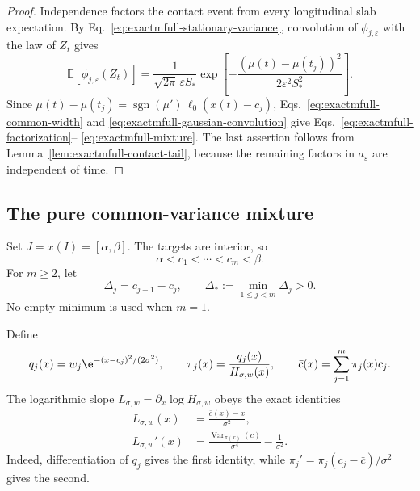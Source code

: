 \begin{proof}
Independence factors the contact event from every longitudinal slab
expectation.  By Eq.~\eqref{eq:exactmfull-stationary-variance}, convolution
of \(\phi_{j,\varepsilon}\) with the law of \(Z_t\) gives
\begin{equation}
 \mathbb E[\phi_{j,\varepsilon}(Z_t)]
 =\frac{1}{\sqrt{2\pi}\,\varepsilon S_*}
 \exp\!\left[-\frac{(\mu(t)-\mu(t_j))^2}
 {2\varepsilon^2S_*^2}\right].
 \label{eq:exactmfull-gaussian-convolution}
\end{equation}
Since
\(\mu(t)-\mu(t_j)=\operatorname{sgn}(\mu')\,\ell_0(x(t)-c_j)\),
Eqs.~\eqref{eq:exactmfull-common-width} and
\eqref{eq:exactmfull-gaussian-convolution} give
Eqs.~\eqref{eq:exactmfull-factorization}--%
\eqref{eq:exactmfull-mixture}.  The last assertion follows from
Lemma~\ref{lem:exactmfull-contact-tail}, because the remaining factors in
\(a_\varepsilon\) are independent of time.
\end{proof}

\subsection{The pure common-variance mixture}
\label{subsec:exactmfull-pure-mixture}

Set \(J=x(I)=[\alpha,\beta]\).  The targets are interior, so
\begin{equation}
 \alpha<c_1<\cdots<c_m<\beta.
 \label{eq:exactmfull-centre-order}
\end{equation}
For \(m\ge2\), let
\begin{equation}
 \Delta_j=c_{j+1}-c_j,
 \qquad \Delta_*:=\min_{1\le j<m}\Delta_j>0.
 \label{eq:exactmfull-gaps}
\end{equation}
No empty minimum is used when \(m=1\).

Define
\begin{equation}
 q_j(x)=w_j\e^{-(x-c_j)^2/(2\sigma^2)},
 \qquad
 \pi_j(x)=\frac{q_j(x)}{H_{\sigma,w}(x)},
 \qquad
 \bar c(x)=\sum_{j=1}^m\pi_j(x)c_j.
 \label{eq:exactmfull-posterior}
\end{equation}
The logarithmic slope \(L_{\sigma,w}=\partial_x\log H_{\sigma,w}\) obeys
the exact identities
\begin{align}
 L_{\sigma,w}(x)
 &=\frac{\bar c(x)-x}{\sigma^2},
 \label{eq:exactmfull-log-slope}\\
 L_{\sigma,w}'(x)
 &=\frac{\operatorname{Var}_{\pi(x)}(c)}{\sigma^4}
   -\frac{1}{\sigma^2}.
 \label{eq:exactmfull-log-slope-derivative}
\end{align}
Indeed, differentiation of \(q_j\) gives the first identity, while
\(\pi_j'=\pi_j(c_j-\bar c)/\sigma^2\) gives the second.

